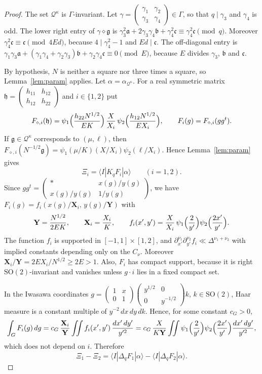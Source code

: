 \documentclass[11pt]{amsart}
\theoremstyle{remark}
\theoremstyle{definition}
\numberwithin{equation}{section}
\newcommand{\Qc}{\mathcal{Q}}
\newcommand{\ga}{\mathfrak{a}}
\newcommand{\gb}{\mathfrak{b}}
\newcommand{\gc}{\mathfrak{c}}
\newcommand{\fg}{\mathfrak{g}}
\newcommand{\bX}{\mathbf{X}}
\newcommand{\bY}{\mathbf{Y}}
\newcommand{\br}[1]{\langle #1\rangle}
\begin{document}
\begin{proof}
The set $\Qc^{\kappa}$ is $\Gamma$-invariant. Let $\gamma=\left(\begin{smallmatrix}\gamma_1&\gamma_2\\ \gamma_3&\gamma_4\end{smallmatrix}\right)\in\Gamma$, so that $q\mid\gamma_3$ and $\gamma_4$ is odd. The lower right entry of $\gamma\diamond\fg$ is $\gamma_3^2\ga+2\gamma_3\gamma_4\gb+\gamma_4^2\gc\equiv\gamma_4^2\gc\pmod q$. Moreover $\gamma_4^2\gc\equiv\gc\pmod{4Ed}$, because $4\mid\gamma_4^2-1$ and $Ed\mid\gc$. The off-diagonal entry is $\gamma_1\gamma_3\ga+(\gamma_1\gamma_4+\gamma_2\gamma_3)\gb+\gamma_2\gamma_4\gc\equiv0\pmod E$, because $E$ divides $\gamma_3$, $\gb$ and $\gc$.

By hypothesis, $N$ is neither a square nor three times a square, so Lemma~\ref{lem:param} applies. Let $\alpha=\alpha_{\Qc^\kappa}$. For a real symmetric matrix $\mathfrak h=\left(\begin{smallmatrix}h_{11}&h_{12}\\ h_{12}&h_{22}\end{smallmatrix}\right)$ and $i\in\{1,2\}$ put
\[
F_{\diamond,i}(\mathfrak h)=\psi_1\Bigl(\frac{h_{22}N^{1/2}}{EK}\Bigr)\,\frac X{X_i}\,\psi_2\Bigl(\frac{h_{12}N^{1/2}}{EX_i}\Bigr),\qquad F_i(g)=F_{\diamond,i}(gg^t).
\]
If $\fg\in\Qc^\kappa$ corresponds to $(\mu,\ell)$, then $F_{\diamond,i}(N^{-1/2}\fg)=\psi_1(\mu/K)(X/X_i)\psi_2(\ell/X_i)$. Hence Lemma~\ref{lem:param} gives
\[
\Xi_i=\br{I|K_qF_i|\alpha}\qquad(i=1,2).
\]
Since $gg^t=\left(\begin{smallmatrix}*&x(g)/y(g)\\ x(g)/y(g)&1/y(g)\end{smallmatrix}\right)$, we have $F_i(g)=f_i(x(g)/\bX_i,\,y(g)/\bY)$ with
\[
\bY=\frac{N^{1/2}}{2EK},\qquad\bX_i=\frac{X_i}K,\qquad f_i(x',y')=\frac X{X_i}\,\psi_1\Bigl(\frac2{y'}\Bigr)\psi_2\Bigl(\frac{2x'}{y'}\Bigr).
\]
The function $f_i$ is supported in $[-1,1]\times[1,2]$, and $\partial_{x'}^{\nu_1}\partial_{y'}^{\nu_2}f_i\ll\Delta^{\nu_1+\nu_2}$ with implied constants depending only on the $C_\nu$. Moreover $\bX_i/\bY=2EX_i/N^{1/2}\ge2E>1$. Also, $F_i$ has compact support, because it is right $\mathrm{SO}(2)$-invariant and vanishes unless $g\cdot i$ lies in a fixed compact set.

In the Iwasawa coordinates $g=\left(\begin{smallmatrix}1&x\\0&1\end{smallmatrix}\right)\left(\begin{smallmatrix}y^{1/2}&0\\0&y^{-1/2}\end{smallmatrix}\right)k$, $k\in\mathrm{SO}(2)$, Haar measure is a constant multiple of $y^{-2}\,dx\,dy\,dk$. Hence, for some constant $c_G>0$,
\[
\int_GF_i(g)\,dg=c_G\,\frac{\bX_i}{\bY}\iint f_i(x',y')\,\frac{dx'\,dy'}{y'^2}=c_G\,\frac{X}{K\bY}\iint\psi_1\Bigl(\frac2{y'}\Bigr)\psi_2\Bigl(\frac{2x'}{y'}\Bigr)\frac{dx'\,dy'}{y'^2},
\]
which does not depend on $i$. Therefore
\begin{equation}\label{eq:difference}
\Xi_1-\Xi_2=\br{I|\Delta_qF_1|\alpha}-\br{I|\Delta_qF_2|\alpha}.
\end{equation}


\end{proof}
\end{document}

